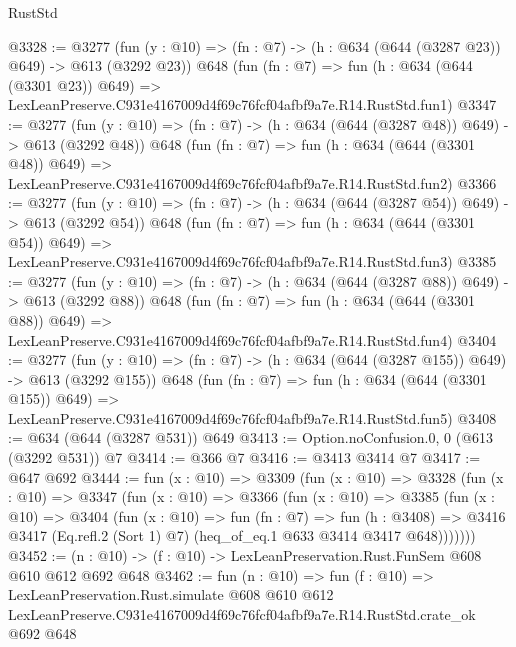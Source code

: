 \begin{lexlean}{RustStd}
\begin{coremodule}
@3328 := @3277
    (fun (y : @10) => (fn : @7) -> (h : @634 (@644 (@3287 @23)) @649) -> @613 (@3292 @23))
    @648
    (fun (fn : @7) =>
    fun (h : @634 (@644 (@3301 @23)) @649) =>
    LexLeanPreserve.C931e4167009d4f69c76fcf04afbf9a7e.R14.RustStd.fun1)
@3347 := @3277
    (fun (y : @10) => (fn : @7) -> (h : @634 (@644 (@3287 @48)) @649) -> @613 (@3292 @48))
    @648
    (fun (fn : @7) =>
    fun (h : @634 (@644 (@3301 @48)) @649) =>
    LexLeanPreserve.C931e4167009d4f69c76fcf04afbf9a7e.R14.RustStd.fun2)
@3366 := @3277
    (fun (y : @10) => (fn : @7) -> (h : @634 (@644 (@3287 @54)) @649) -> @613 (@3292 @54))
    @648
    (fun (fn : @7) =>
    fun (h : @634 (@644 (@3301 @54)) @649) =>
    LexLeanPreserve.C931e4167009d4f69c76fcf04afbf9a7e.R14.RustStd.fun3)
@3385 := @3277
    (fun (y : @10) => (fn : @7) -> (h : @634 (@644 (@3287 @88)) @649) -> @613 (@3292 @88))
    @648
    (fun (fn : @7) =>
    fun (h : @634 (@644 (@3301 @88)) @649) =>
    LexLeanPreserve.C931e4167009d4f69c76fcf04afbf9a7e.R14.RustStd.fun4)
@3404 := @3277
    (fun (y : @10) => (fn : @7) -> (h : @634 (@644 (@3287 @155)) @649) -> @613 (@3292 @155))
    @648
    (fun (fn : @7) =>
    fun (h : @634 (@644 (@3301 @155)) @649) =>
    LexLeanPreserve.C931e4167009d4f69c76fcf04afbf9a7e.R14.RustStd.fun5)
@3408 := @634 (@644 (@3287 @531)) @649
@3413 := Option.noConfusion.{0, 0} (@613 (@3292 @531)) @7
@3414 := @366 @7
@3416 := @3413 @3414 @7
@3417 := @647 @692
@3444 := fun (x : @10) =>
  @3309
    (fun (x : @10) =>
    @3328
      (fun (x : @10) =>
      @3347
        (fun (x : @10) =>
        @3366
          (fun (x : @10) =>
          @3385
            (fun (x : @10) =>
            @3404
              (fun (x : @10) =>
              fun (fn : @7) =>
              fun (h : @3408) =>
              @3416 @3417 (Eq.refl.{2} (Sort 1) @7) (heq_of_eq.{1} @633 @3414 @3417 @648)))))))
@3452 := (n : @10) -> (f : @10) -> LexLeanPreservation.Rust.FunSem @608 @610 @612 @692 @648
@3462 := fun (n : @10) =>
  fun (f : @10) =>
  LexLeanPreservation.Rust.simulate
    @608
    @610
    @612
    LexLeanPreserve.C931e4167009d4f69c76fcf04afbf9a7e.R14.RustStd.crate_ok
    @692
    @648
\end{coremodule}
\end{lexlean}
